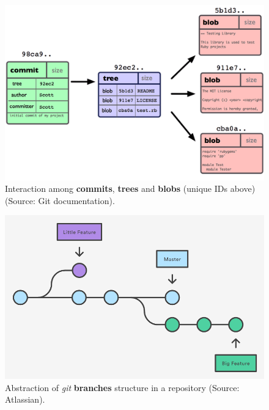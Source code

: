 \documentclass[a4paper, 12pt]{book}
\begin{document}
\begin{figure}
  \centering
  \includegraphics[width=12cm, keepaspectratio]{img/git-objs-example}
  \caption{Interaction among \textbf{commits}, \textbf{trees} and \textbf{blobs} (unique IDs above) (Source: Git documentation).}
  \label{fig:git-objs-example}
\end{figure}
\begin{figure}
  \centering
  \includegraphics[width=12cm, keepaspectratio]{img/branches-example-atlassian}
  \caption{Abstraction of \emph{git} \textbf{branches} structure in a repository (Source: Atlassian).}
  \label{fig:git-branches-example}
\end{figure}
\end{document}
